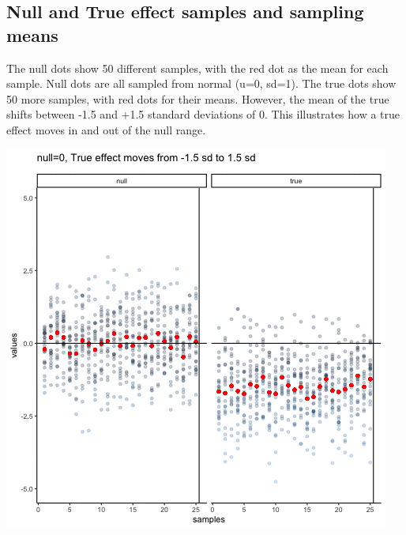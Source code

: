 \documentclass[
]{book}
\begin{document}
\hypertarget{null-and-true-effect-samples-and-sampling-means}{%
\subsection{Null and True effect samples and sampling means}\label{null-and-true-effect-samples-and-sampling-means}}

The null dots show 50 different samples, with the red dot as the mean for each sample. Null dots are all sampled from normal (u=0, sd=1). The true dots show 50 more samples, with red dots for their means. However, the mean of the true shifts between -1.5 and +1.5 standard deviations of 0. This illustrates how a true effect moves in and out of the null range.

\includegraphics{gifs/sampleNullTrue-1.gif}
\end{document}
